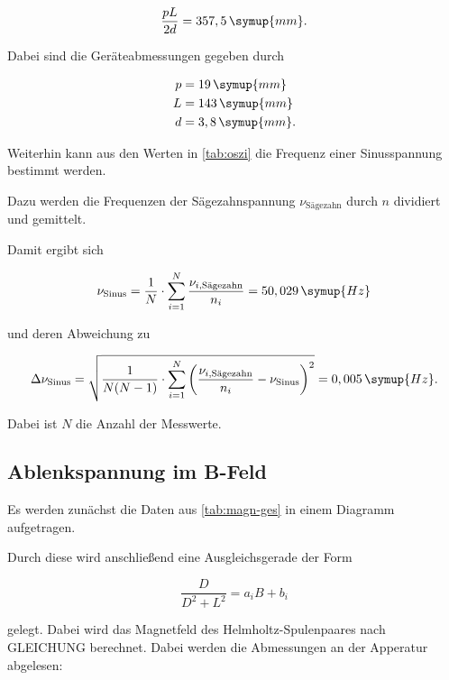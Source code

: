 \begin{equation}
  \frac{p L}{2 d} = 357,5 \, \symup{mm}.
\end{equation}

Dabei sind die Geräteabmessungen gegeben durch

\begin{align*}
  p &= 19  \, \symup{mm} \\
  L &= 143 \, \symup{mm} \\
  d &= 3,8 \, \symup{mm}.
\end{align*}

Weiterhin kann aus den Werten in \autoref{tab:oszi} die Frequenz einer Sinusspannung bestimmt werden.



Dazu werden die Frequenzen der Sägezahnspannung $\nu_\text{Sägezahn}$ durch $n$ dividiert und gemittelt.

Damit ergibt sich 

\begin{equation}
  \nu_\text{Sinus} = \frac{1}{N} \cdot \sum_{i=1}^{N} \frac{\nu_{i, \text{Sägezahn}} }{n_i} = 50,029 \, \symup{Hz}
\end{equation}

und deren Abweichung zu 

\begin{equation}
  \Delta \nu_\text{Sinus} = \sqrt{ \frac{1}{N(N-1)} \cdot \sum_{i=1}^{N} \bigg( \frac{\nu_{i, \text{Sägezahn}}}{n_i} - \nu_\text{Sinus} \bigg)^2 } = 0,005 \, \symup{Hz}.
\end{equation}

Dabei ist $N$ die Anzahl der Messwerte.

\subsection{Ablenkspannung im B-Feld}

Es werden zunächst die Daten aus \autoref{tab:magn-ges} in einem Diagramm aufgetragen.



Durch diese wird anschließend eine Ausgleichsgerade der Form

\begin{equation}
  \frac{D}{D^2 + L^2} = a_i B + b_i
\end{equation}

gelegt. Dabei wird das Magnetfeld des Helmholtz-Spulenpaares nach GLEICHUNG berechnet.
Dabei werden die Abmessungen an der Apperatur abgelesen:


